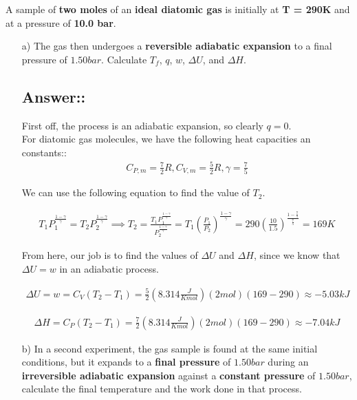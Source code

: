 \documentclass[12pt]{book}
\begin{document}
A sample of \textbf{two moles} of an \textbf{ideal diatomic gas} is initially at \textbf{T = 290K} and at a pressure of \textbf{10.0 bar}.

\begin{itemize}
    \item[a)]The gas then undergoes a \textbf{reversible adiabatic expansion} to a final pressure of $1.50bar$. Calculate $T_f$, $q$, $w$, $\Delta U$, and $\Delta H$.
    
    \subsection*{Answer::}
    First off, the process is an adiabatic expansion, so clearly $q=0$.\\

    For diatomic gas molecules, we have the following heat capacities an constants::
    \begin{align*}
        C_{P,m}=\frac{7}{2}R,C_{V,m}=\frac{5}{2}R,\gamma=\frac{7}{5}
    \end{align*}

    We can use the following equation to find the value of $T_2$.

    \begin{align*}
        T_1P_1^{\frac{1-\gamma}{\gamma}}=T_2P_2^{\frac{1-\gamma}{\gamma}}\implies T_2=\frac{T_1P_1^{\frac{1-\gamma}{\gamma}}}{P_2^{\frac{1-\gamma}{\gamma}}}=T_1\left(\frac{P_1}{P_2}\right)^{\frac{1-\gamma}{\gamma}}=290\left(\frac{10}{1.5}\right)^{\frac{1-\frac{7}{5}}{\frac{7}{5}}}=169K
    \end{align*}

    From here, our job is to find the values of $\Delta U$ and $\Delta H$, since we know that $\Delta U=w$ in an adiabatic process.

    \begin{align*}
        \Delta U=w=C_V(T_2-T_1)=\frac{5}{2}\left(8.314\frac{J}{Kmol}\right)(2mol)(169-290)\approx -5.03kJ
    \end{align*}

    \begin{align*}
        \Delta H=C_P(T_2-T_1)=\frac{7}{2}\left(8.314\frac{J}{Kmol}\right)(2mol)(169-290)\approx -7.04kJ
    \end{align*}

    \item[b)] In a second experiment, the gas sample is found at the same initial conditions, but it
    expands to a \textbf{final pressure} of $1.50bar$ during an \textbf{irreversible adiabatic expansion} against a \textbf{constant pressure} of $1.50bar$, calculate the final temperature and the work done in that process.


\end{itemize}
\end{document}
